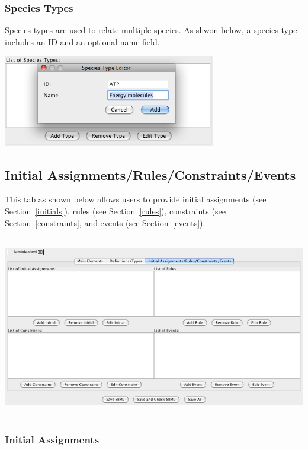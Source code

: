 \documentclass[titlepage,11pt]{article}
\begin{document}
\subsubsection{\label{specTypes}Species Types}

\noindent
Species types are used to relate multiple species.  As shwon below, a 
species type includes an ID and an optional name field.
\begin{center}
\includegraphics[height=40mm]{screenshots/specType}
\end{center}

\subsection{\label{InitRuleConstEvent}Initial Assignments/Rules/Constraints/Events}

\noindent
This tab as shown below allows users to provide initial assignments 
(see Section~\ref{initials}), 
rules (see Section~\ref{rules}), 
constraints (see Section~\ref{constraints}, and
events (see Section~\ref{events}).
\begin{center}
\includegraphics[height=80mm]{screenshots/IRCE}
\end{center}

\subsubsection{\label{initials}Initial Assignments}
\end{document}
